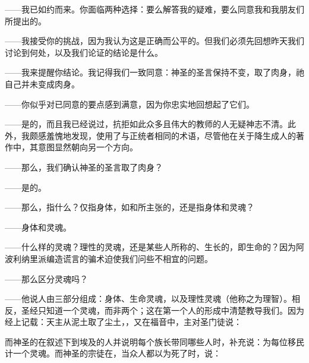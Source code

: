 \par

——我已如约而来。你面临两种选择：要么解答我的疑难，要么同意我和我朋友们所提出的。\par

——我接受你的挑战，因为我认为这是正确而公平的。但我们必须先回想昨天我们讨论到何处，以及我们论证的结论是什么。\par

——我来提醒你结论。我记得我们一致同意：神圣的圣言保持不变，取了肉身，祂自己并未变成肉身。\par

——你似乎对已同意的要点感到满意，因为你忠实地回想起了它们。\par

——是的，而且我已经说过，抗拒如此众多且伟大的教师的人无疑神志不清。此外，我颇感羞愧地发现，使用了与正统者相同的术语，尽管他在关于降生成人的著作中，其意图显然朝向另一个方向。\par

——那么，我们确认神圣的圣言取了肉身？\par

——是的。\par

——那么，指什么？仅指身体，如和所主张的，还是指身体和灵魂？\par

——身体和灵魂。\par

——什么样的灵魂？理性的灵魂，还是某些人所称的、生长的，即生命的？因为阿波利纳里派编造谎言的骗术迫使我们问些不相宜的问题。\par

——那么区分灵魂吗？\par

——他说人由三部分组成：身体、生命灵魂，以及理性灵魂（他称之为理智）。相反，圣经只知道一个灵魂，而非两个；这在第一个人的形成中清楚教导我们。因为经上记载：天主从泥土取了尘土，，又在福音中，主对圣门徒说：\par

而神圣的在叙述下到埃及的人并说明每个族长带同哪些人时，补充说：为每位移民计一个灵魂。而神圣的宗徒在，当众人都以为死了时，说：\par

